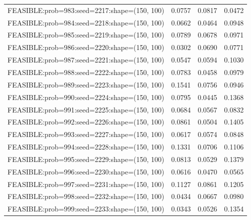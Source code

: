 \begin{longtable}{lccc}
FEASIBLE:prob=983:seed=2217:shape=(150, 100) & 0.0757 & 0.0817 & 0.0472 \\
FEASIBLE:prob=984:seed=2218:shape=(150, 100) & 0.0662 & 0.0464 & 0.0948 \\
FEASIBLE:prob=985:seed=2219:shape=(150, 100) & 0.0789 & 0.0678 & 0.0971 \\
FEASIBLE:prob=986:seed=2220:shape=(150, 100) & 0.0302 & 0.0690 & 0.0771 \\
FEASIBLE:prob=987:seed=2221:shape=(150, 100) & 0.0547 & 0.0594 & 0.1030 \\
FEASIBLE:prob=988:seed=2222:shape=(150, 100) & 0.0783 & 0.0458 & 0.0979 \\
FEASIBLE:prob=989:seed=2223:shape=(150, 100) & 0.1541 & 0.0756 & 0.0946 \\
FEASIBLE:prob=990:seed=2224:shape=(150, 100) & 0.0795 & 0.0445 & 0.1368 \\
FEASIBLE:prob=991:seed=2225:shape=(150, 100) & 0.0684 & 0.0567 & 0.0832 \\
FEASIBLE:prob=992:seed=2226:shape=(150, 100) & 0.0861 & 0.0504 & 0.1405 \\
FEASIBLE:prob=993:seed=2227:shape=(150, 100) & 0.0617 & 0.0574 & 0.0848 \\
FEASIBLE:prob=994:seed=2228:shape=(150, 100) & 0.1331 & 0.0706 & 0.1106 \\
FEASIBLE:prob=995:seed=2229:shape=(150, 100) & 0.0813 & 0.0529 & 0.1379 \\
FEASIBLE:prob=996:seed=2230:shape=(150, 100) & 0.0616 & 0.0470 & 0.0565 \\
FEASIBLE:prob=997:seed=2231:shape=(150, 100) & 0.1127 & 0.0861 & 0.1205 \\
FEASIBLE:prob=998:seed=2232:shape=(150, 100) & 0.0434 & 0.0667 & 0.0980 \\
FEASIBLE:prob=999:seed=2233:shape=(150, 100) & 0.0343 & 0.0526 & 0.1354 \\
\end{longtable}
